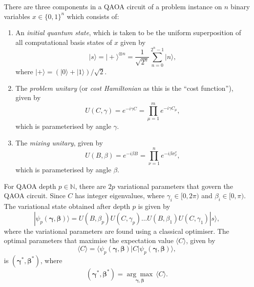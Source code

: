     There are three components in a QAOA circuit of a problem instance on $n$ binary variables $x\in\{0,1\}^n$ which consists of:
    \begin{enumerate}
        \item An \emph{initial quantum state}, which is taken to be the uniform superposition of all computational basis states of $x$ given by 
        \begin{equation}
            |s\rangle =|+\rangle ^{\otimes n} = \frac{1}{\sqrt{2^n}}\sum^{2^n-1}_{n=0}|n\rangle,
        \end{equation}
        where $|+\rangle = (|0\rangle+|1\rangle)/\sqrt{2}$.
        \item The \emph{problem unitary} (or \emph{cost Hamiltonian} as this is the ``cost function''), given by 
        \begin{equation}
            U(C,\gamma) = e^{-i\gamma C} = \prod^m_{\mu=1}e^{-i\gamma C_\mu},
        \end{equation}
        which is parameterised by angle $\gamma$.
        \item The \emph{mixing unitary}, given by 
        \begin{equation}
            U(B,\beta) = e^{-i\beta B} = \prod^n_{\nu=1} e^{-i\beta \sigma^x_\nu},
        \end{equation}
        which is parameterised by angle $\beta$.
    \end{enumerate}
    For QAOA depth $p\in \mathbb{N}$, there are $2p$ variational parameters that govern the QAOA circuit. Since $C$ has integer eigenvalues, where $\gamma_i\in[0,2\pi)$ and $\beta_i\in[0,\pi)$. The variational state obtained after depth $p$ is given by 
    \begin{equation}
        |\psi_p(\pmb{\gamma},\pmb{\beta})\rangle = U(B,\beta_p)U(C,\gamma_p)\dots U(B,\beta_1)U(C,\gamma_1)|s\rangle,
    \end{equation}
    where the variational parameters are found using a classical optimiser. The optimal parameters that maximise the expectation value $\langle C\rangle$, given by 
    \begin{equation}
        \langle C \rangle = \langle \psi_p (\pmb{\gamma},\pmb{\beta})| C |\psi_p(\pmb{\gamma},\pmb{\beta})\rangle,
    \end{equation}
    is $(\pmb{\gamma^*},\pmb{\beta^*})$, where
    \begin{equation}
        (\pmb{\gamma^*},\pmb{\beta^*}) = \underset{\pmb{\gamma},\pmb{\beta}}{\arg\max}\, \langle C\rangle.
    \end{equation}

